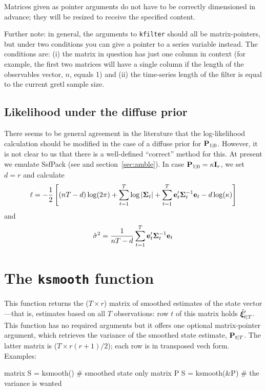 Matrices given as pointer arguments do not have to be correctly
dimensioned in advance; they will be resized to receive the specified
content.

Further note: in general, the arguments to \texttt{kfilter} should all
be matrix-pointers, but under two conditions you can give a pointer to
a series variable instead.  The conditions are: (i) the matrix in
question has just one column in context (for example, the first two
matrices will have a single column if the length of the observables
vector, $n$, equals 1) and (ii) the time-series length of the filter
is equal to the current gretl sample size.

\subsection{Likelihood under the diffuse prior}

There seems to be general agreement in the literature that the
log-likelihood calculation should be modified in the case of a diffuse
prior for $\mathbf{P}_{1|0}$.  However, it is not clear to us that
there is a well-defined ``correct'' method for this.  At present we
emulate \textsf{SsfPack} (see \cite{koopman-etal99} and
section~\ref{sec:amble}).  In case $\mathbf{P}_{1|0} = \kappa
\mathbf{I}_r$, we set $d = r$ and calculate
%
\[
  \ell = -\frac{1}{2} \left[(nT-d) \log(2 \pi) + 
    \sum_{t=1}^T\log \left|\bm{\Sigma}_t\right| + 
    \sum_{t=1}^T\mathbf{e}_t'\bm{\Sigma}_t^{-1} \mathbf{e}_t
    - d \log(\kappa)
  \right]
\]
%
and
%
\[
\hat{\sigma}^2 = \frac{1}{nT-d} 
   \sum_{t=1}^T\mathbf{e}_t'\bm{\Sigma}_t^{-1} \mathbf{e}_t
\]

\section{The \texttt{ksmooth} function}

This function returns the ($T \times r$) matrix of smoothed estimates
of the state vector---that is, estimates based on all $T$
observations: row $t$ of this matrix holds $\hat{\bm{\xi}}_{t|T}'$.  This
function has no required arguments but it offers one optional
matrix-pointer argument, which retrieves the variance of the smoothed
state estimate, $\mathbf{P}_{t|T}$.  The latter matrix is ($T \times
r(r+1)/2$); each row is in transposed vech form.  Examples:
%
\begin{code}
matrix S = ksmooth()  # smoothed state only
matrix P
S = ksmooth(&P)       # the variance is wanted
\end{code}

